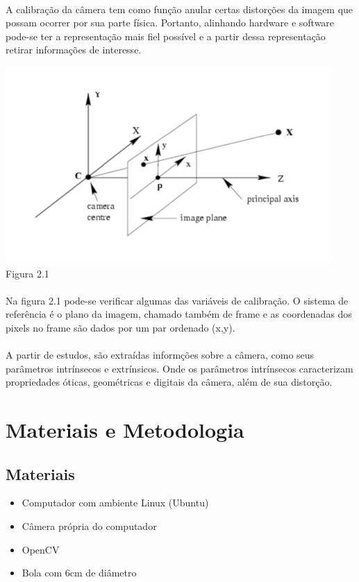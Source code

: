 \documentclass{article}
\begin{document}
		\paragraph{}
		A calibração da câmera tem como função anular certas distorções da imagem que possam ocorrer por sua parte física. Portanto, alinhando hardware e software pode-se ter a representação mais fiel possível e a partir dessa representação retirar informações de interesse.
		\begin{center}
			\includegraphics[scale=0.4]{CalibrationVariables}\\
			Figura 2.1
		\end{center}
		\paragraph{}
		Na figura 2.1 pode-se verificar algumas das variáveis de calibração. O sistema de referência é o plano da imagem, chamado também de frame e as coordenadas dos pixels no frame são dados por um par ordenado (x,y). 
		\paragraph{}
		A partir de estudos, são extraídas informções sobre a câmera, como seus parâmetros intrínsecos e extrínsicos. Onde os parâmetros intrínsecos caracterizam propriedades óticas, geométricas e digitais da câmera, além de sua distorção.
	\section{Materiais e Metodologia}
		\subsection{Materiais}
			\begin{itemize}
			\item Computador com ambiente Linux (Ubuntu)
			\item Câmera própria do computador
			\item OpenCV
			\item Bola com 6cm de diâmetro
			\end{itemize}
\end{document}

